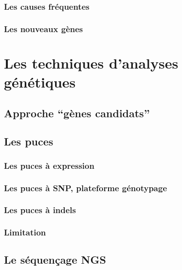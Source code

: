 \documentclass[12pt,twoside]{ugathesis}
\begin{document}
\subsubsection{Les causes fréquentes}\label{les-causes-frequentes}

\subsubsection{Les nouveaux gènes}\label{les-nouveaux-genes}

\section{Les techniques d'analyses
génétiques}\label{les-techniques-danalyses-genetiques}

\subsection{\texorpdfstring{Approche ``gènes
candidats''}{Approche gènes candidats}}\label{approche-genes-candidats}

\subsection{Les puces}\label{les-puces}

\subsubsection{Les puces à expression}\label{les-puces-a-expression}

\subsubsection{Les puces à SNP, plateforme
génotypage}\label{les-puces-a-snp-plateforme-genotypage}

\subsubsection{Les puces à indels}\label{les-puces-a-indels}

\subsubsection{Limitation}\label{limitation}

\subsection{Le séquençage NGS}\label{ngs}
\end{document}
